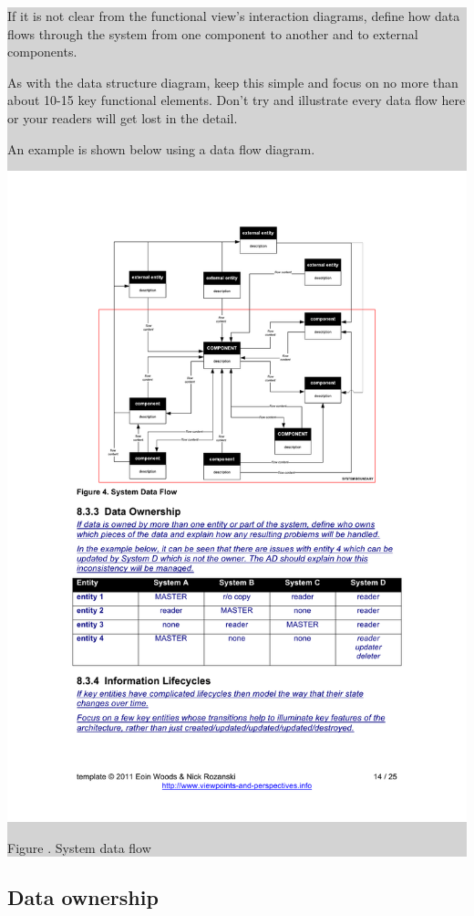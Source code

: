 \documentclass[a4paper,11pt]{report}
\newcommand{\instructions}[1]{
  \noindent\colorbox{lightgray}{%
    \parbox{\linewidth}{%
      #1
    }%
  }%
 \vspace{0.1cm}
}
\newcommand{\mycaption}[1]{
  \addtocounter{figures}{1}
  Figure \arabic{figures}. #1
}
\begin{document}
\instructions{
If it is not clear from the functional view’s interaction diagrams,
define how data flows through the system from one component to another
and to external components.

As with the data structure diagram, keep this simple and focus on no
more than about 10-15 key functional elements. Don’t try and
illustrate every data flow here or your readers will get lost in the
detail.

An example is shown below using a data flow diagram.

\begin{center}
  \includegraphics[width=\textwidth]{figures/systemdataflow}\\
  \mycaption{System data flow}
\end{center}
}

\subsection{Data ownership}
\label{sec:data-ownership}
\end{document}
